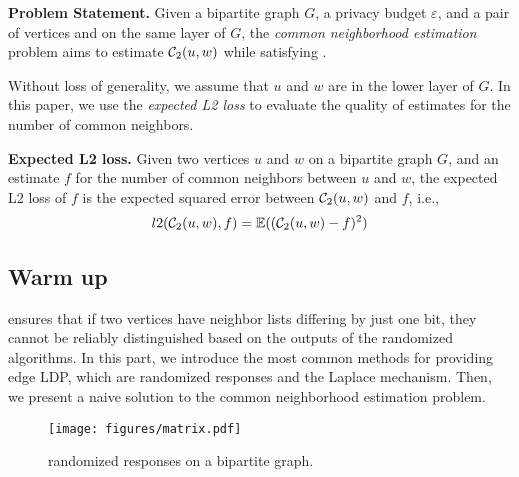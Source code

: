 \noindent
{\bf Problem Statement.}
Given a bipartite graph $G$, a privacy budget $\varepsilon$, and a pair of vertices \vq and \vx on the same layer of $G$, the {\em common neighborhood estimation} problem aims to estimate $\mathcal{C}_2(u,w)$ while satisfying \epldp. 

{\color{black}Without loss of generality, we assume that $u$ and $w$ are in the lower layer of $G$.} In this paper, we use the {\em expected L2 loss} to evaluate the quality of estimates for the number of common neighbors. 
\begin{definition}
\label{def:l2}
{\bf Expected L2 loss.} %
Given two vertices $u$ and $w$ on a bipartite graph $G$, and an estimate $f$ for the number of common neighbors between $u$ and $w$, the expected L2 loss of $f$ is the expected squared error between $\mathcal{C}_2(u,w)$ and $f$, i.e., $$l2( \mathcal{C}_2(u,w), f ) = \mathbb{E}(( \mathcal{C}_2(u,w) - f  )^2)$$
\end{definition}

\subsection{Warm up}
\epldp ensures that if two vertices have neighbor lists differing by just one bit, they cannot be reliably distinguished based on the outputs of the randomized algorithms. 
In this part, we introduce the most common methods for providing edge LDP, which are randomized responses and the Laplace mechanism. 
Then, we present a naive solution to the common neighborhood estimation problem. 


\begin{figure}[thb]
\texttt{[image: figures/matrix.pdf]}
\myspace
\caption{randomized responses on a bipartite graph. 
}
\label{fig:matrix}
\myspace
\end{figure}

